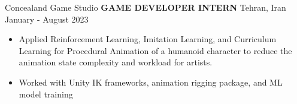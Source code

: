 \begin{cventries}
    \cventry
    {Concealand Game Studio}
    {\textbf{GAME DEVELOPER INTERN}}
    {Tehran, Iran}
    {January - August 2023}
    {
        \begin{itemize}    
            \item Applied Reinforcement Learning, Imitation Learning, and Curriculum Learning for Procedural Animation of a humanoid character to reduce the animation state complexity and workload for artists.
            \item Worked with Unity IK frameworks, animation rigging package, and ML model training
        \end{itemize}
    }
\end{cventries}





